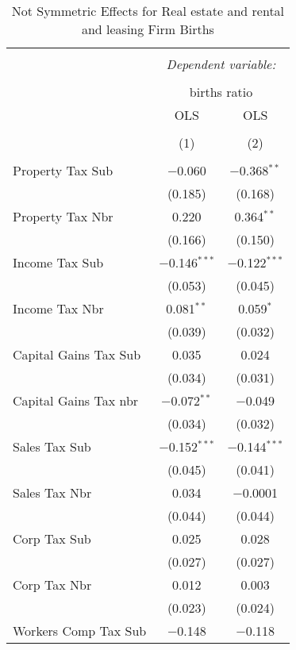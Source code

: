 
\begin{table}[!htbp] \centering 
  \caption{Not Symmetric Effects for  Real estate and rental and leasing Firm Births} 
  \label{53noequality} 
\begin{tabular}{@{\extracolsep{5pt}}lcc} 
\\[-1.8ex]\hline 
\hline \\[-1.8ex] 
 & \multicolumn{2}{c}{\textit{Dependent variable:}} \\ 
\cline{2-3} 
\\[-1.8ex] & \multicolumn{2}{c}{births ratio} \\ 
 & OLS & OLS \\ 
\\[-1.8ex] & (1) & (2)\\ 
\hline \\[-1.8ex] 
 Property Tax Sub & $-$0.060 & $-$0.368$^{**}$ \\ 
  & (0.185) & (0.168) \\ 
  Property Tax Nbr & 0.220 & 0.364$^{**}$ \\ 
  & (0.166) & (0.150) \\ 
  Income Tax Sub & $-$0.146$^{***}$ & $-$0.122$^{***}$ \\ 
  & (0.053) & (0.045) \\ 
  Income Tax Nbr & 0.081$^{**}$ & 0.059$^{*}$ \\ 
  & (0.039) & (0.032) \\ 
  Capital Gains Tax Sub & 0.035 & 0.024 \\ 
  & (0.034) & (0.031) \\ 
  Capital Gains Tax nbr & $-$0.072$^{**}$ & $-$0.049 \\ 
  & (0.034) & (0.032) \\ 
  Sales Tax Sub & $-$0.152$^{***}$ & $-$0.144$^{***}$ \\ 
  & (0.045) & (0.041) \\ 
  Sales Tax Nbr & 0.034 & $-$0.0001 \\ 
  & (0.044) & (0.044) \\ 
  Corp Tax Sub & 0.025 & 0.028 \\ 
  & (0.027) & (0.027) \\ 
  Corp Tax Nbr & 0.012 & 0.003 \\ 
  & (0.023) & (0.024) \\ 
  Workers Comp Tax Sub & $-$0.148 & $-$0.118 \\ 

\end{tabular}
\end{table}
